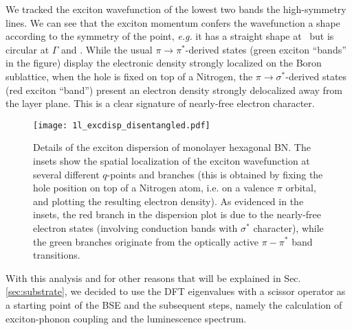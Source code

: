 We tracked the exciton wavefunction of the lowest two bands the high-symmetry lines. We can see that the exciton momentum confers the wavefunction a shape according to the symmetry of the point, \textit{e.g.} it has a straight shape at \MM~but is circular at $\Gamma$ and \KK. 
While the usual $\pi \rightarrow \pi^*$-derived states (green exciton ``bands'' in the figure) display the electronic density strongly localized on the Boron sublattice, when the hole is fixed on top of a Nitrogen, the $\pi \rightarrow \sigma^*$-derived states (red exciton ``band'') present an electron density strongly delocalized away from the layer plane. This is a clear signature of nearly-free electron character.
\begin{figure}[h!b]
	\vspace{0.2cm}
	\setcapindent{2em}
	\centering
	\texttt{[image: 1l\_excdisp\_disentangled.pdf]}
	\caption{Details of the exciton dispersion of monolayer hexagonal BN. The insets show the spatial localization of the exciton wavefunction at several different $q$-points and branches (this is obtained by fixing the hole position on top of a Nitrogen atom, i.e. on a valence $\pi$ orbital, and plotting the resulting electron density). As evidenced in the insets, the red branch in the dispersion plot is due to the nearly-free electron states (involving conduction bands with $\sigma^*$ character), while the green branches originate from the optically active $\pi-\pi^*$ band transitions.}
	\label{fig:mBN_excdisp_wf}
\end{figure}

With this analysis and for other reasons that will be explained in Sec. \ref{sec:substrate}, we decided to use the \acrshort{DFT} eigenvalues with a scissor operator as a starting point of the \acrshort{BSE} and the subsequent steps, namely the calculation of exciton-phonon coupling and the luminescence spectrum.

%
